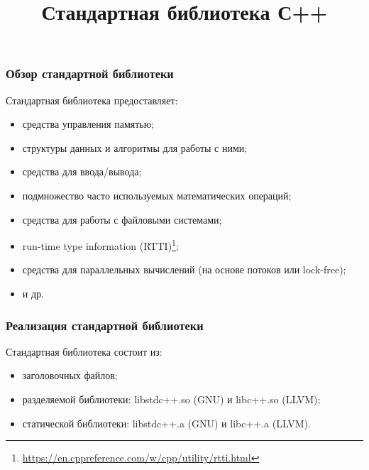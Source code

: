 \documentclass[compress, 8pt, aspectratio=169]{beamer}
\title{Стандартная библиотека С++}
\begin{document}
  \frame[plain]{\titlepage}

  \begin{frame}[fragile]

    \frametitle{Обзор стандартной библиотеки}

    Стандартная библиотека предоставляет:
    \hfill \break

    \begin{itemize}

      \item средства управления памятью;
      \item структуры данных и алгоритмы для работы с ними;
      \item средства для ввода/вывода;
      \item подмножество часто используемых математических операций;
      \item средства для работы с файловыми системами;
      \item run-time type information (RTTI)\footnote{\url{https://en.cppreference.com/w/cpp/utility/rtti.html}};
      \item средства для параллельных вычислений (на основе потоков или lock-free);
      \item и др.

    \end{itemize}

  \end{frame}

  \begin{frame}[fragile]

    \frametitle{Реализация стандартной библиотеки}

    Стандартная библиотека состоит из:
    \hfill \break

    \begin{itemize}

      \item заголовочных файлов;
      \item разделяемой библиотеки: libstdc++.so (GNU) и libc++.so (LLVM);
      \item статической библиотеки: libstdc++.a (GNU) и libc++.a (LLVM).

    \end{itemize}

  \end{frame}
\end{document}

